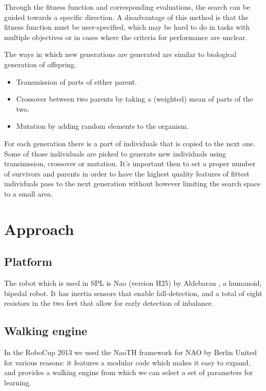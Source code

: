 \documentclass[a4paper, twocolumn]{article}
\begin{document}
Through the fitness function and corresponding evaluations, the search can be guided towards a specific direction. A disadvantage of this method is that the fitness function must be user-specified, which may be hard to do in tasks with multiple objectives or in cases where the criteria for performance are unclear. 

The ways in which new generations are generated are similar to biological generation of offspring.  
\begin{itemize} 
\item Transmission of parts of either parent.
\item Crossover between two parents by taking a (weighted) mean of parts of the two.
\item Mutation by adding random elements to the organism.
\end{itemize}


For each generation there is a part of individuals that is copied to the next one. Some of those individuals are picked to generate new individuals using transimssion, crossover or mutation. It's important then to set a proper number of survivors and parents in order to have the highest quality features of fittest individuals pass to the next generation without however limiting the search space to a small area. 



\section{Approach}
\subsection{Platform}
The robot which is used in SPL is Nao (version H25) by Aldebaran \citep{gouaillier2009mechatronic}, a humanoid, bipedal robot. It has inertia sensors that enable fall-detection, and a total of eight resistors in the two feet that allow for early detection of inbalance. 

\subsection{Walking engine}
In the RoboCup 2013 we used the NaoTH framework for NAO by Berlin United
\citep{naothdescription} for various reasons: it features a modular code which
makes it easy to expand, and provides a walking engine from which we can select
a set of parameters for learning. 
\end{document}
